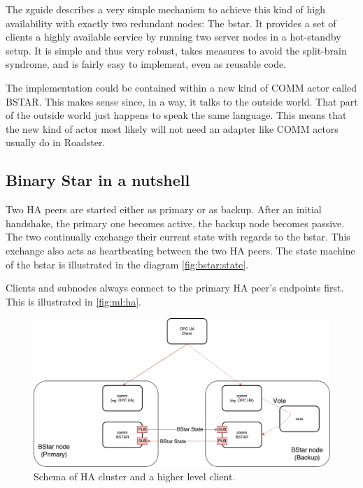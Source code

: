 The \gls{zguide} describes a very simple mechanism to achieve this kind of high
availability with exactly two redundant nodes: The \gls{bstar}. It
provides a set of clients a highly available service by running two server
nodes in a hot-standby setup. It is simple and thus very robust, takes measures to avoid the
split-brain syndrome, and is fairly easy to implement, even as reusable
code.

The implementation could be contained within a new kind of COMM actor
called BSTAR. This makes sense since, in a way, it talks to the outside world.
That part of the outside world just happens to speak the same language. This
means that the new kind of actor most likely will not need an adapter like COMM
actors usually do in Roadster.

\subsection{Binary Star in a nutshell}
Two HA peers are started either as primary or as backup. After an initial
handshake, the primary one becomes active, the backup node becomes passive. The
two continually exchange their current state with regards to
the \gls{bstar}. This exchange also acts as heartbeating between the two HA
peers. The state machine of the \gls{bstar} is illustrated in the diagram
\autoref{fig:bstar:state}.

Clients and subnodes always connect to the primary HA peer's endpoints first. This
is illustrated in \autoref{fig:ml:ha}.

\begin{figure}[]
	\includegraphics[width=\textwidth]{img/ML-HA_bstar.pdf}
	\caption{Schema of HA cluster and a higher level client.}
	\label{fig:ml:ha}
\end{figure}

